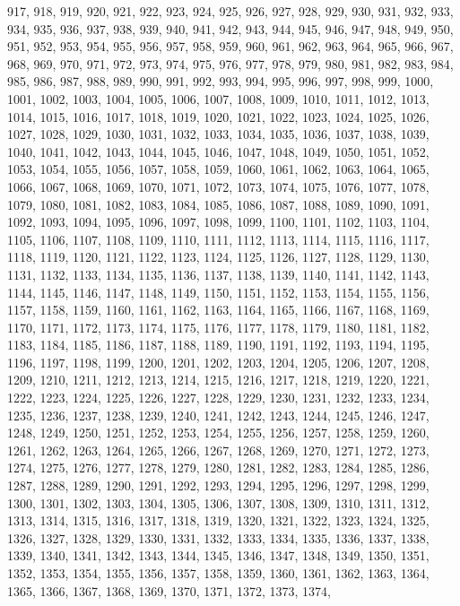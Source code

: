 \documentclass[a4paper,11pt]{article}
\begin{document}
917, 918, 919, 920, 921, 922, 923, 924, 925, 926, 927, 928, 929, 930,
931, 932, 933, 934, 935, 936, 937, 938, 939, 940, 941, 942, 943, 944,
945, 946, 947, 948, 949, 950, 951, 952, 953, 954, 955, 956, 957, 958,
959, 960, 961, 962, 963, 964, 965, 966, 967, 968, 969, 970, 971, 972,
973, 974, 975, 976, 977, 978, 979, 980, 981, 982, 983, 984, 985, 986,
987, 988, 989, 990, 991, 992, 993, 994, 995, 996, 997, 998, 999, 1000,
1001, 1002, 1003, 1004, 1005, 1006, 1007, 1008, 1009, 1010, 1011,
1012, 1013, 1014, 1015, 1016, 1017, 1018, 1019, 1020, 1021, 1022,
1023, 1024, 1025, 1026, 1027, 1028, 1029, 1030, 1031, 1032, 1033,
1034, 1035, 1036, 1037, 1038, 1039, 1040, 1041, 1042, 1043, 1044,
1045, 1046, 1047, 1048, 1049, 1050, 1051, 1052, 1053, 1054, 1055,
1056, 1057, 1058, 1059, 1060, 1061, 1062, 1063, 1064, 1065, 1066,
1067, 1068, 1069, 1070, 1071, 1072, 1073, 1074, 1075, 1076, 1077,
1078, 1079, 1080, 1081, 1082, 1083, 1084, 1085, 1086, 1087, 1088,
1089, 1090, 1091, 1092, 1093, 1094, 1095, 1096, 1097, 1098, 1099,
1100, 1101, 1102, 1103, 1104, 1105, 1106, 1107, 1108, 1109, 1110,
1111, 1112, 1113, 1114, 1115, 1116, 1117, 1118, 1119, 1120, 1121,
1122, 1123, 1124, 1125, 1126, 1127, 1128, 1129, 1130, 1131, 1132,
1133, 1134, 1135, 1136, 1137, 1138, 1139, 1140, 1141, 1142, 1143,
1144, 1145, 1146, 1147, 1148, 1149, 1150, 1151, 1152, 1153, 1154,
1155, 1156, 1157, 1158, 1159, 1160, 1161, 1162, 1163, 1164, 1165,
1166, 1167, 1168, 1169, 1170, 1171, 1172, 1173, 1174, 1175, 1176,
1177, 1178, 1179, 1180, 1181, 1182, 1183, 1184, 1185, 1186, 1187,
1188, 1189, 1190, 1191, 1192, 1193, 1194, 1195, 1196, 1197, 1198,
1199, 1200, 1201, 1202, 1203, 1204, 1205, 1206, 1207, 1208, 1209,
1210, 1211, 1212, 1213, 1214, 1215, 1216, 1217, 1218, 1219, 1220,
1221, 1222, 1223, 1224, 1225, 1226, 1227, 1228, 1229, 1230, 1231,
1232, 1233, 1234, 1235, 1236, 1237, 1238, 1239, 1240, 1241, 1242,
1243, 1244, 1245, 1246, 1247, 1248, 1249, 1250, 1251, 1252, 1253,
1254, 1255, 1256, 1257, 1258, 1259, 1260, 1261, 1262, 1263, 1264,
1265, 1266, 1267, 1268, 1269, 1270, 1271, 1272, 1273, 1274, 1275,
1276, 1277, 1278, 1279, 1280, 1281, 1282, 1283, 1284, 1285, 1286,
1287, 1288, 1289, 1290, 1291, 1292, 1293, 1294, 1295, 1296, 1297,
1298, 1299, 1300, 1301, 1302, 1303, 1304, 1305, 1306, 1307, 1308,
1309, 1310, 1311, 1312, 1313, 1314, 1315, 1316, 1317, 1318, 1319,
1320, 1321, 1322, 1323, 1324, 1325, 1326, 1327, 1328, 1329, 1330,
1331, 1332, 1333, 1334, 1335, 1336, 1337, 1338, 1339, 1340, 1341,
1342, 1343, 1344, 1345, 1346, 1347, 1348, 1349, 1350, 1351, 1352,
1353, 1354, 1355, 1356, 1357, 1358, 1359, 1360, 1361, 1362, 1363,
1364, 1365, 1366, 1367, 1368, 1369, 1370, 1371, 1372, 1373, 1374,
\end{document}
